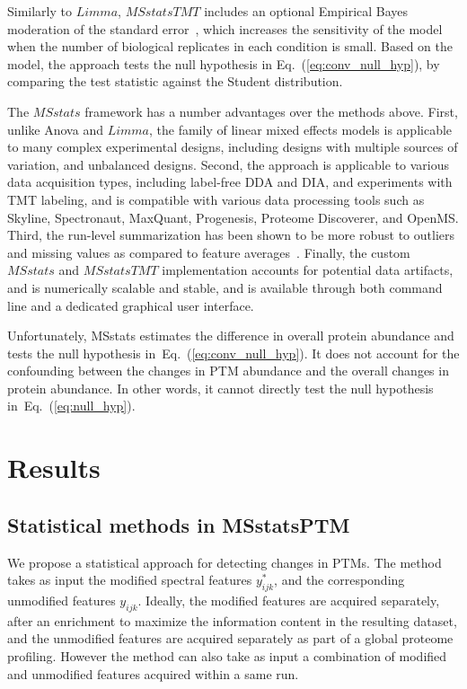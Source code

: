 \documentclass[mcp]{article}
\numberwithin{table}{section}
\def\eqref#1{Eq.~(\ref{eq:#1})}
\begin{document}
Similarly to $Limma$, $MSstatsTMT$ includes an optional Empirical Bayes moderation of the standard error~\cite{Huang:2020}, which increases the sensitivity of the model when the number of biological replicates in each condition is small. Based on the model, the approach tests the null hypothesis in \eqref{conv_null_hyp}, by comparing the test statistic against the Student distribution.

The $MSstats$ framework has a number advantages over the methods above. 
First, unlike Anova and $Limma$, the family of linear mixed effects models is applicable to many complex experimental designs, including designs with multiple sources of variation, and unbalanced designs. 
Second, the approach is applicable to various data acquisition types, including label-free DDA and DIA, and experiments with TMT labeling, and is compatible with various data processing tools such as Skyline, Spectronaut, MaxQuant, Progenesis, Proteome Discoverer, and OpenMS. Third, the run-level summarization has been shown to be more robust to outliers and missing values as compared to feature averages~\cite{Choi:2014}. 
Finally, the custom $MSstats$ and $MSstatsTMT$ implementation accounts for potential data artifacts, and is numerically scalable and stable, and is available through both command line and a dedicated graphical user interface.

Unfortunately, MSstats estimates the difference in overall protein abundance and tests the null hypothesis in~\eqref{conv_null_hyp}. It does not account for the confounding between the changes in PTM abundance and the overall changes in protein abundance. In other words, it cannot directly test the null hypothesis in~\eqref{null_hyp}.

\section{Results}

\subsection*{Statistical methods in MSstatsPTM}
\label{sec:adjustment_summary}

\medskip {}

\medskip \noindent
We propose a statistical approach for detecting changes in PTMs. The method takes as input the modified spectral features $y_{ijk}^{\ast}$, and the corresponding unmodified features $y_{ijk}$. Ideally, the modified features are acquired separately, after an enrichment to maximize the information content in the resulting dataset, and the unmodified features are acquired separately as part of a global proteome profiling. However the method can also take as input a combination of modified and unmodified features acquired within a same run.
\end{document}
